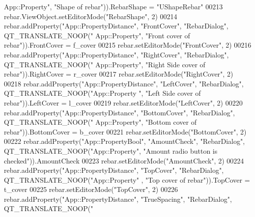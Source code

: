 \begin{DoxyCode}
{      App::Property"}, \textcolor{stringliteral}{"Shape of rebar"})).RebarShape = \textcolor{stringliteral}{"UShapeRebar"}
00213     rebar.ViewObject.setEditorMode(\textcolor{stringliteral}{"RebarShape"}, 2)
00214     rebar.addProperty(\textcolor{stringliteral}{"App::PropertyDistance"}, \textcolor{stringliteral}{"FrontCover"}, \textcolor{stringliteral}{"RebarDialog"}, QT\_TRANSLATE\_NOOP(\textcolor{stringliteral}{"
      App::Property"}, \textcolor{stringliteral}{"Front cover of rebar"})).FrontCover = f\_cover
00215     rebar.setEditorMode(\textcolor{stringliteral}{"FrontCover"}, 2)
00216     rebar.addProperty(\textcolor{stringliteral}{"App::PropertyDistance"}, \textcolor{stringliteral}{"RightCover"}, \textcolor{stringliteral}{"RebarDialog"}, QT\_TRANSLATE\_NOOP(\textcolor{stringliteral}{"
      App::Property"}, \textcolor{stringliteral}{"Right Side cover of rebar"})).RightCover = r\_cover
00217     rebar.setEditorMode(\textcolor{stringliteral}{"RightCover"}, 2)
00218     rebar.addProperty(\textcolor{stringliteral}{"App::PropertyDistance"}, \textcolor{stringliteral}{"LeftCover"}, \textcolor{stringliteral}{"RebarDialog"}, QT\_TRANSLATE\_NOOP(\textcolor{stringliteral}{"App::Property
      "}, \textcolor{stringliteral}{"Left Side cover of rebar"})).LeftCover = l\_cover
00219     rebar.setEditorMode(\textcolor{stringliteral}{"LeftCover"}, 2)
00220     rebar.addProperty(\textcolor{stringliteral}{"App::PropertyDistance"}, \textcolor{stringliteral}{"BottomCover"}, \textcolor{stringliteral}{"RebarDialog"}, QT\_TRANSLATE\_NOOP(\textcolor{stringliteral}{"
      App::Property"}, \textcolor{stringliteral}{"Bottom cover of rebar"})).BottomCover = b\_cover
00221     rebar.setEditorMode(\textcolor{stringliteral}{"BottomCover"}, 2)
00222     rebar.addProperty(\textcolor{stringliteral}{"App::PropertyBool"}, \textcolor{stringliteral}{"AmountCheck"}, \textcolor{stringliteral}{"RebarDialog"}, QT\_TRANSLATE\_NOOP(\textcolor{stringliteral}{"App::Property"},
       \textcolor{stringliteral}{"Amount radio button is checked"})).AmountCheck
00223     rebar.setEditorMode(\textcolor{stringliteral}{"AmountCheck"}, 2)
00224     rebar.addProperty(\textcolor{stringliteral}{"App::PropertyDistance"}, \textcolor{stringliteral}{"TopCover"}, \textcolor{stringliteral}{"RebarDialog"}, QT\_TRANSLATE\_NOOP(\textcolor{stringliteral}{"App::Property"}
      , \textcolor{stringliteral}{"Top cover of rebar"})).TopCover = t\_cover
00225     rebar.setEditorMode(\textcolor{stringliteral}{"TopCover"}, 2)
00226     rebar.addProperty(\textcolor{stringliteral}{"App::PropertyDistance"}, \textcolor{stringliteral}{"TrueSpacing"}, \textcolor{stringliteral}{"RebarDialog"}, QT\_TRANSLATE\_NOOP(\textcolor{stringliteral}{"
}
\end{DoxyCode}
